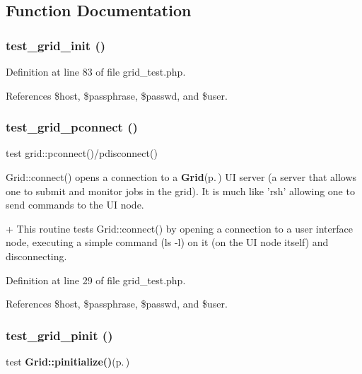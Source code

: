 \subsection{Function Documentation}
\subsubsection{\setlength{\rightskip}{0pt plus 5cm}test\_\-grid\_\-init ()}\label{grid__test_8php_a8}




Definition at line 83 of file grid\_\-test.php.

References \$host, \$passphrase, \$passwd, and \$user.
\subsubsection{\setlength{\rightskip}{0pt plus 5cm}test\_\-grid\_\-pconnect ()}\label{grid__test_8php_a6}


test grid::pconnect()/pdisconnect() 

Grid::connect() opens a connection to a {\bf Grid}{\rm (p.\,\pageref{classGrid})} UI server (a server that allows one to submit and monitor jobs in the grid). It is much like 'rsh' allowing one to send commands to the UI node.

+ This routine tests Grid::connect() by opening a connection to a user interface node, executing a simple command (ls -l) on it (on the UI node itself) and disconnecting. 

Definition at line 29 of file grid\_\-test.php.

References \$host, \$passphrase, \$passwd, and \$user.
\subsubsection{\setlength{\rightskip}{0pt plus 5cm}test\_\-grid\_\-pinit ()}\label{grid__test_8php_a7}


test {\bf Grid::pinitialize()}{\rm (p.\,\pageref{classGrid_a11})} 

